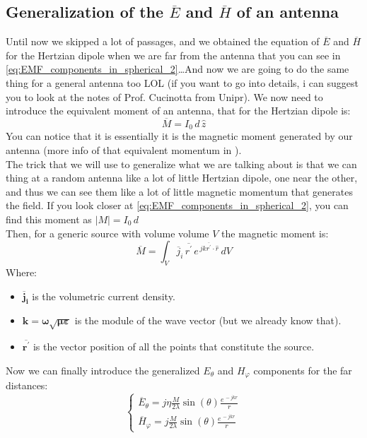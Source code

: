 \subsection*{Generalization of the $\overline{E}$ and $\overline{H}$ of an antenna}
Until now we skipped a lot of passages, and we obtained the equation of $\overline{E}$ and $\overline{H}$ for the Hertzian dipole when we are far from the antenna that you can see in \cref{eq:EMF_components_in_spherical_2}\dots And now we are going to do the same thing for a general antenna too LOL (if you want to go into details, i can suggest you to look at the notes of Prof. Cucinotta from Unipr\cite{Appunti_unipr}).
We now need to introduce the equivalent moment of an antenna, that for the Hertzian dipole is:
\begin{equation}
    \overline{M}=I_0 \, d \, \hat{z}
\end{equation}
You can notice that it is essentially it is the magnetic moment generated by our antenna (more info of that equivalent momentum in \cite{Ellingson2020Radiation}).\\
The trick that we will use to generalize what we are talking about is that we can thing at a random antenna like a lot of little Hertzian dipole, one near the other, and thus we can see them like a lot of little magnetic momentum that generates the field. If you look closer at \cref{eq:EMF_components_in_spherical_2}, you can find this moment as $|M|=I_0\,d$\\
Then, for a generic source with volume volume $V$ the magnetic moment is:
\begin{equation}
    \overline{M}=\int_V\overline{j}_i\,\overline{r^\prime}\,e^{\,jk\overline{r^\prime}\cdot \hat{r}}\, dV
\end{equation}
Where:
\begin{itemize}
    \item $\bm{\overline{j}_i}$ is the volumetric current density.
    \item $\bm{k=\omega\sqrt{\mu\varepsilon}}$ is the module of the wave vector (but we already know that).
    \item $\bm{\overline{r^\prime}}$ is the vector position of all the points that constitute the source.
\end{itemize}
Now we can finally introduce the generalized $E_\theta$ and $H_\varphi$ components for the far distances:
\begin{equation}\label{eq:EMF_components_in_spherical_generalized1}
    \begin{cases}
        \overline{E}_\theta = j\eta \frac{M}{2\lambda}\sin(\theta)\frac{e^{\,-jkr}}{r}\\[5pt]
        \overline{H}_\varphi = j\frac{M}{2\lambda}\sin(\theta)\frac{e^{\,-jkr}}{r}
    \end{cases}
\end{equation}

